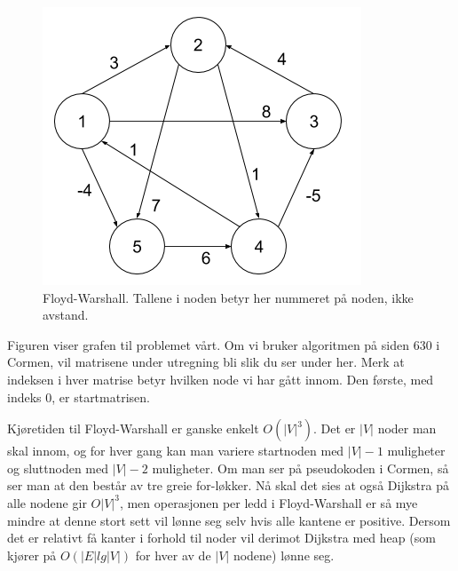 \begin{boxed}
\begin{figure}[H]
\includegraphics[scale=0.5]{images/floyd-warshall}
\centering %
\caption{Floyd-Warshall. Tallene i noden betyr her nummeret på noden, ikke avstand.}
\label{fig:floyd-warshall}
\end{figure}

Figuren viser grafen til problemet vårt. Om vi bruker algoritmen på siden 630 i Cormen, vil matrisene under utregning bli slik du ser under her. Merk at indeksen i hver matrise betyr hvilken node vi har gått innom. Den første, med indeks 0, er startmatrisen. %
\end{boxed}

\noindent Kjøretiden til Floyd-Warshall er ganske enkelt $O(|V|^3)$. Det er $|V|$ noder man skal innom, og for hver gang kan man variere startnoden med $|V| - 1$ muligheter og sluttnoden med $|V| - 2$ muligheter. Om man ser på pseudokoden i Cormen, så ser man at den består av tre greie for-løkker. Nå skal det sies at også Dijkstra på alle nodene gir $O|V|^3$, men operasjonen per ledd i Floyd-Warshall er så mye mindre at denne stort sett vil lønne seg selv hvis alle kantene er positive. Dersom det er relativt få kanter i forhold til noder vil derimot Dijkstra med heap (som kjører på $O(|E| lg |V|)$ for hver av de $|V|$ nodene) lønne seg.


